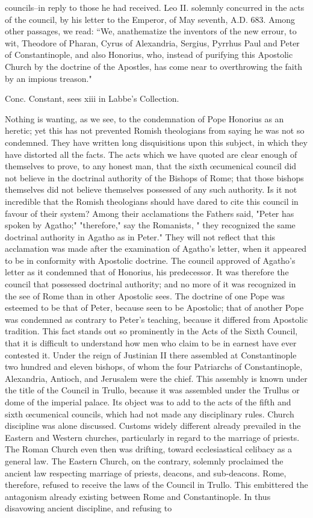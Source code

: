 councils--in reply to those he had received. Leo II. solemnly concurred in the acts of the council, by his letter to the Emperor, of May seventh, A.D. 683. Among other passages, we read: “We, anathematize the inventors of the new errour, to wit, Theodore of Pharan, Cyrus of Alexandria, Sergius, Pyrrhus Paul and Peter of Constantinople, and also Honorius, who, instead of purifying this Apostolic Church by the doctrine of the Apostles, has come near to overthrowing the faith by an impious treason."

Conc. Constant, sees xiii in Labbe’s Collection.

Nothing is wanting, as we see, to the condemnation of Pope Honorius as an heretic; yet this has not prevented Romish theologians from saying he was not so condemned. They have written long disquisitions upon this subject, in which they have distorted all the facts. The acts which we have quoted are clear enough of themselves to prove, to any honest man, that the sixth œcumenical council did not believe in the doctrinal authority of the Bishops of Rome; that those bishops themselves did not believe themselves possessed of any such authority. Is it not incredible that the Romish theologians should have dared to cite this council in favour of their system? Among their acclamations the Fathers said, "Peter has spoken by Agatho;" "therefore," say the Romanists, " they recognized the same doctrinal authority in Agatho as in Peter." They will not reflect that this acclamation was made after the examination of Agatho's letter, when it appeared to be in conformity with Apostolic doctrine. The council approved of Agatho's letter as it condemned that of Honorius, his predecessor. It was therefore the council that possessed doctrinal authority; and no more of it was recognized in the see of Rome than in other Apostolic sees. The doctrine of one Pope was esteemed to be that of Peter, because seen to be Apostolic; that of another Pope was condemned as contrary to Peter's teaching, because it differed from Apostolic tradition. This fact stands out so prominently in the Acts of the Sixth Council, that it is difficult to understand how men who claim to be in earnest have ever contested it. Under the reign of Justinian II there assembled at Constantinople two hundred and eleven bishops, of whom the four Patriarchs of Constantinople, Alexandria, Antioch, and Jerusalem were the chief. This assembly is known under the title of the Council in Trullo, because it was assembled under the Trullus or dome of the imperial palace. Its object was to add to the acts of the fifth and sixth œcumenical councils, which had not made any disciplinary rules. Church discipline was alone discussed. Customs widely different already prevailed in the Eastern and Western churches, particularly in regard to the marriage of priests. The Roman Church even then was drifting, toward ecclesiastical celibacy as a general law. The Eastern Church, on the contrary, solemnly proclaimed the ancient law respecting marriage of priests, deacons, and sub-deacons. Rome, therefore, refused to receive the laws of the Council in Trullo. This embittered the antagonism already existing between Rome and Constantinople. In thus disavowing ancient discipline, and refusing to 